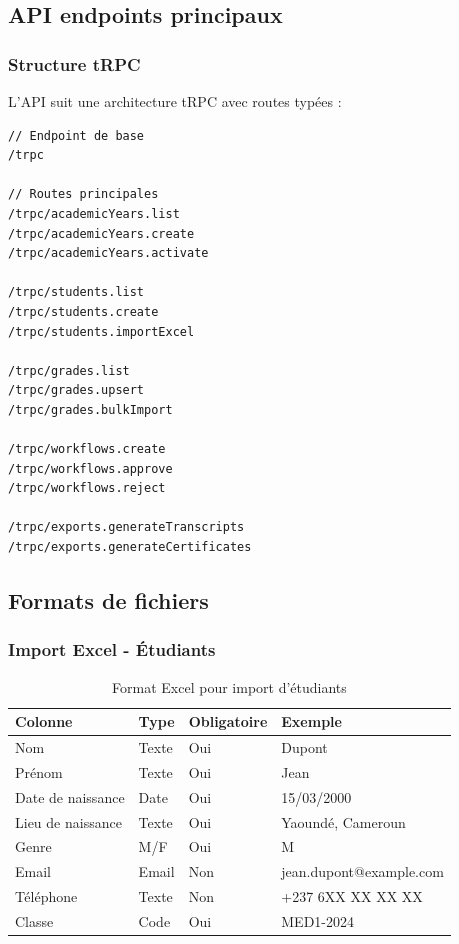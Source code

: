 \subsection{API endpoints principaux}

\subsubsection{Structure tRPC}

L'API suit une architecture tRPC avec routes typées :

\begin{lstlisting}[frame=single, basicstyle=\small\ttfamily]
// Endpoint de base
/trpc

// Routes principales
/trpc/academicYears.list
/trpc/academicYears.create
/trpc/academicYears.activate

/trpc/students.list
/trpc/students.create
/trpc/students.importExcel

/trpc/grades.list
/trpc/grades.upsert
/trpc/grades.bulkImport

/trpc/workflows.create
/trpc/workflows.approve
/trpc/workflows.reject

/trpc/exports.generateTranscripts
/trpc/exports.generateCertificates
\end{lstlisting}

\subsection{Formats de fichiers}

\subsubsection{Import Excel - Étudiants}

\begin{table}[h]
\centering
\footnotesize
\begin{tabular}{|l|l|l|l|}
\hline
\textbf{Colonne} & \textbf{Type} & \textbf{Obligatoire} & \textbf{Exemple} \\
\hline
Nom & Texte & Oui & Dupont \\
Prénom & Texte & Oui & Jean \\
Date de naissance & Date & Oui & 15/03/2000 \\
Lieu de naissance & Texte & Oui & Yaoundé, Cameroun \\
Genre & M/F & Oui & M \\
Email & Email & Non & jean.dupont@example.com \\
Téléphone & Texte & Non & +237 6XX XX XX XX \\
Classe & Code & Oui & MED1-2024 \\
\hline
\end{tabular}
\caption{Format Excel pour import d'étudiants}
\end{table}

